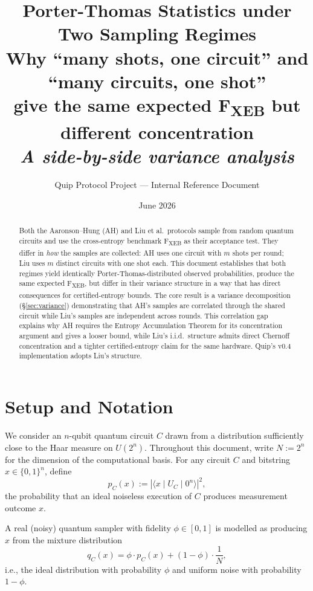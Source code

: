 \documentclass[11pt]{article}
\title{\textbf{Porter-Thomas Statistics under Two Sampling Regimes}\\[0.5em]
\large Why ``many shots, one circuit'' and ``many circuits, one shot'' \\ 
give the same expected F\textsubscript{XEB} but different concentration\\[0.5em]
\large \textit{A side-by-side variance analysis}}
\author{Quip Protocol Project --- Internal Reference Document}
\date{June 2026}
\theoremstyle{definition}
\theoremstyle{remark}
\begin{document}
\maketitle

\begin{abstract}
\noindent
Both the Aaronson--Hung (AH) and Liu et al.\ protocols sample from random
quantum circuits and use the cross-entropy benchmark F\textsubscript{XEB} as
their acceptance test. They differ in \textit{how} the samples are collected:
AH uses one circuit with $m$ shots per round; Liu uses $m$ distinct circuits
with one shot each. This document establishes that both regimes yield
identically Porter-Thomas-distributed observed probabilities, produce the
same expected F\textsubscript{XEB}, but differ in their variance structure
in a way that has direct consequences for certified-entropy bounds. The
core result is a variance decomposition (\S\ref{sec:variance})
demonstrating that AH's samples are correlated through the shared circuit
while Liu's samples are independent across rounds. This correlation gap
explains why AH requires the Entropy Accumulation Theorem for its
concentration argument and gives a looser bound, while Liu's i.i.d.\ structure
admits direct Chernoff concentration and a tighter certified-entropy claim
for the same hardware. Quip's v0.4 implementation adopts Liu's structure.
\end{abstract}

\tableofcontents
\vspace{1em}

\section{Setup and Notation}

We consider an $n$-qubit quantum circuit $C$ drawn from a distribution
sufficiently close to the Haar measure on $U(2^n)$. Throughout this
document, write $N := 2^n$ for the dimension of the computational basis.
For any circuit $C$ and bitstring $x \in \{0,1\}^n$, define
\[
  p_C(x) := |\langle x \mid U_C \mid 0^n \rangle|^2,
\]
the probability that an ideal noiseless execution of $C$ produces measurement
outcome $x$.

A real (noisy) quantum sampler with fidelity $\phi \in [0,1]$ is modelled
as producing $x$ from the mixture distribution
\[
  q_C(x) = \phi \cdot p_C(x) + (1-\phi) \cdot \frac{1}{N},
\]
i.e., the ideal distribution with probability $\phi$ and uniform noise with
probability $1-\phi$.
\end{document}
